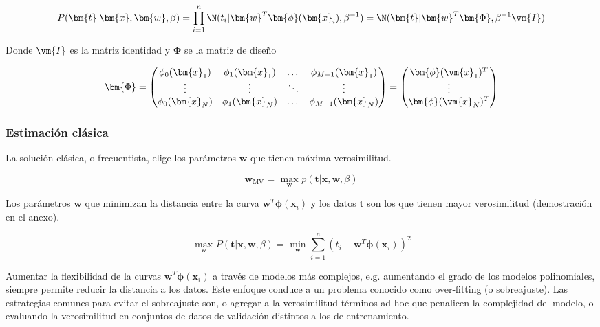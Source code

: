 \documentclass[a4paper,10pt]{article}
\begin{document}
\begin{equation}
P(\bm{t} | \bm{x}, \bm{w}, \beta) = \prod_{i=1}^n \N(t_i | \bm{w}^T \bm{\phi}(\bm{x}_i) , \beta^{-1}) = \N(\bm{t}|\bm{w}^T \bm{\Phi}, \beta^{-1} \vm{I})
\end{equation}

Donde $\vm{I}$ es la matriz identidad y $\bm{\Phi}$ se la matriz de diseño

\begin{equation}
 \bm{\Phi} =
  \begin{pmatrix}
    \phi_0(\bm{x}_1) & \phi_1(\bm{x}_1) & \dots & \phi_{M-1}(\bm{x}_1)\\
    \vdots & \vdots & \ddots & \vdots \\
    \phi_0(\bm{x}_N) & \phi_1(\bm{x}_N) & \dots & \phi_{M-1}(\bm{x}_N)
  \end{pmatrix}
  = 
  \begin{pmatrix}
   \bm{\phi}(\vm{x}_1)^T \\
   \vdots \\
   \bm{\phi}(\vm{x}_N)^T \\
  \end{pmatrix}
\end{equation}


\subsubsection{Estimaci\'on cl\'asica}

La soluci\'on cl\'asica, o frecuentista, elige los par\'ametros $\bm{w}$ que tienen máxima verosimilitud.

\begin{equation}
 \bm{w}_\text{MV} = \underset{\bm{w}}{\text{ max }} p(\bm{t} | \bm{x}, \bm{w}, \beta)
\end{equation}

Los par\'ametros $\bm{w}$ que minimizan la distancia entre la curva $\bm{w}^T\bm{\phi}(\bm{x}_i)$ y los datos $\bm{t}$ son los que tienen mayor verosimilitud (demostraci\'on en el anexo).

\begin{equation}
 \underset{\bm{w}}{\text{ max }} P(\bm{t} | \bm{x}, \bm{w}, \beta) = \underset{\bm{w}}{\text{ min }} \sum_{i=1}^{n}  (t_i - \bm{w}^T\bm{\phi}(\bm{x}_i))^2 
\end{equation}

Aumentar la flexibilidad de la curvas $\bm{w}^T\bm{\phi}(\bm{x}_i)$ a trav\'es de modelos m\'as complejos, e.g. aumentando el grado de los modelos polinomiales, siempre permite reducir la distancia a los datos.
Este enfoque conduce a un problema conocido como over-fitting (o sobreajuste).
Las estrategias comunes para evitar el sobreajuste son, o agregar a la verosimilitud t\'erminos ad-hoc que penalicen la complejidad del modelo, o evaluando la verosimilitud en conjuntos de datos de validaci\'on distintos a los de entrenamiento.
\end{document}
